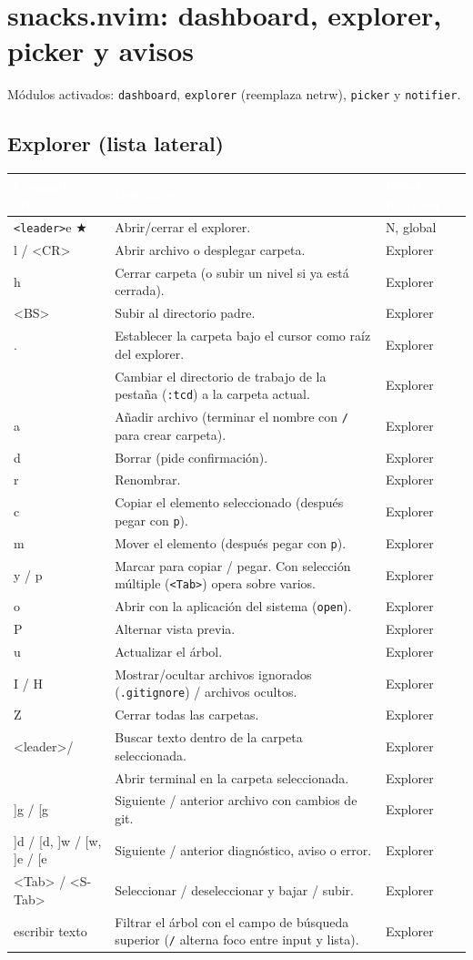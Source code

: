 \documentclass[8pt,a4paper,landscape]{extarticle}
\newcommand{\kk}[1]{\texttt{#1}}
\newcommand{\ld}{\texttt{<leader>}}
\newcommand{\mk}{\textcolor{mine}{$\bigstar$}}   %
\newenvironment{cht}{%
  \begin{longtable}{>{\raggedright\arraybackslash\ttfamily}p{0.27\textwidth}
                    >{\raggedright\arraybackslash}p{0.46\textwidth}
                    >{\raggedright\arraybackslash}p{0.21\textwidth}}
  \rowcolor{accent}\textcolor{white}{\textbf{\rmfamily Comando / atajo}} &
  \textcolor{white}{\textbf{Qué hace}} & \textcolor{white}{\textbf{Dónde funciona}} \\
  \endhead
}{\end{longtable}}
\newcommand{\rr}[3]{#1 & #2 & #3 \\}
\newcommand{\rg}[3]{\rowcolor{rowgray}\relax #1 & #2 & #3 \\}
\let\oldsubsection\subsection
\renewcommand{\subsection}{\Needspace{9\baselineskip}\oldsubsection}
\let\oldsection\section
\renewcommand{\section}{\Needspace{10\baselineskip}\oldsection}
\begin{document}
\section{snacks.nvim: dashboard, explorer, picker y avisos}
Módulos activados: \kk{dashboard}, \kk{explorer} (reemplaza netrw), \kk{picker} y \kk{notifier}.

\subsection{Explorer (lista lateral)}
\begin{cht}
\rg{\ld e \mk}{Abrir/cerrar el explorer.}{N, global}
\rr{l / <CR>}{Abrir archivo o desplegar carpeta.}{Explorer}
\rg{h}{Cerrar carpeta (o subir un nivel si ya está cerrada).}{Explorer}
\rr{<BS>}{Subir al directorio padre.}{Explorer}
\rg{.}{Establecer la carpeta bajo el cursor como raíz del explorer.}{Explorer}
\rr{<C-c>}{Cambiar el directorio de trabajo de la pestaña (\kk{:tcd}) a la carpeta actual.}{Explorer}
\rg{a}{Añadir archivo (terminar el nombre con \kk{/} para crear carpeta).}{Explorer}
\rr{d}{Borrar (pide confirmación).}{Explorer}
\rg{r}{Renombrar.}{Explorer}
\rr{c}{Copiar el elemento seleccionado (después pegar con \kk{p}).}{Explorer}
\rg{m}{Mover el elemento (después pegar con \kk{p}).}{Explorer}
\rr{y / p}{Marcar para copiar / pegar. Con selección múltiple (\kk{<Tab>}) opera sobre varios.}{Explorer}
\rg{o}{Abrir con la aplicación del sistema (\kk{open}).}{Explorer}
\rr{P}{Alternar vista previa.}{Explorer}
\rg{u}{Actualizar el árbol.}{Explorer}
\rr{I / H}{Mostrar/ocultar archivos ignorados (\kk{.gitignore}) / archivos ocultos.}{Explorer}
\rg{Z}{Cerrar todas las carpetas.}{Explorer}
\rr{<leader>/}{Buscar texto dentro de la carpeta seleccionada.}{Explorer}
\rg{<C-t>}{Abrir terminal en la carpeta seleccionada.}{Explorer}
\rr{]g / [g}{Siguiente / anterior archivo con cambios de git.}{Explorer}
\rg{]d / [d, ]w / [w, ]e / [e}{Siguiente / anterior diagnóstico, aviso o error.}{Explorer}
\rr{<Tab> / <S-Tab>}{Seleccionar / deseleccionar y bajar / subir.}{Explorer}
\rg{escribir texto}{Filtrar el árbol con el campo de búsqueda superior (\kk{/} alterna foco entre input y lista).}{Explorer}
\end{cht}
\end{document}
